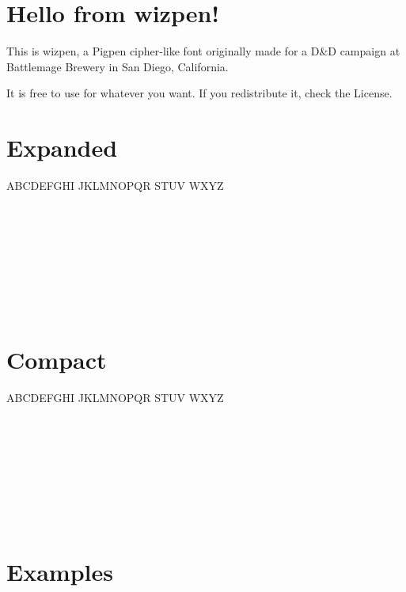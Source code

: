 \documentclass[letterpaper]{article}
\begin{document}
\section*{Hello from {\wizpenfont wizpen}\enspace!}

This is wizpen, a Pigpen cipher-like font originally made for
a D\&D campaign at Battlemage Brewery in San Diego, California.

\noindent It is free to use for whatever you want. If you redistribute it,
check the License.

\section*{Expanded}

{
    \Large \wizpenfont \noindent \lsstyle
    ABCDEFGHI JKLMNOPQR STUV WXYZ \\ \\
}
{
    \Large \noindent
     \\ \\
}

{
    \Large \wizpenfont \noindent {} \\ \\
}
{
    \Large \noindent
     \\ \\
}

\section*{Compact}

{
    \Large \wizpenfont \noindent
    ABCDEFGHI JKLMNOPQR STUV WXYZ \\ \\
}
{
    \Large \noindent
     \\ \\
}

{
    \Large \wizpenfont {} \\ \\
}
{
    \Large \noindent
     \\ \\
}

\clearpage

\section*{Examples}
\end{document}
